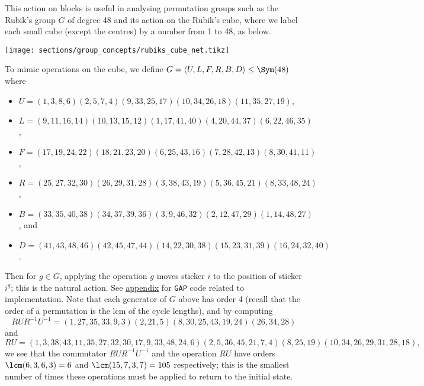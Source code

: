 \begin{example}\label{eg:rubiks_group}
    This action on blocks is useful in analysing permutation groups such as the Rubik's group $G$ of degree 48 and its action on the Rubik's cube, where we label each small cube (except the centres) by a number from 1 to 48, as below.

    \begin{center}
        \texttt{[image: sections/group\_concepts/rubiks\_cube\_net.tikz]}
    \end{center}

    To mimic operations on the cube, we define $G = \langle U,L,F,R,B,D \rangle \leq \Sym(48)$ where
    \begin{itemize}
        \item $U = ( 1, 3, 8, 6)( 2, 5, 7, 4)( 9,33,25,17)(10,34,26,18)(11,35,27,19)$,
        \item $L = ( 9,11,16,14)(10,13,15,12)( 1,17,41,40)( 4,20,44,37)( 6,22,46,35)$,
        \item $F = (17,19,24,22)(18,21,23,20)( 6,25,43,16)( 7,28,42,13)( 8,30,41,11)$,
        \item $R = (25,27,32,30)(26,29,31,28)( 3,38,43,19)( 5,36,45,21)( 8,33,48,24)$,
        \item $B = (33,35,40,38)(34,37,39,36)( 3, 9,46,32)( 2,12,47,29)( 1,14,48,27)$, and
        \item $D = (41,43,48,46)(42,45,47,44)(14,22,30,38)(15,23,31,39)(16,24,32,40)$.
    \end{itemize}
    Then for $g \in G$, applying the operation $g$ moves sticker $i$ to the position of sticker $i^g$; this is the natural action. See \hyperref[app:rubiks_group]{appendix} for \texttt{GAP} code related to implementation. Note that each generator of $G$ above has order 4 (recall that the order of a permutation is the lcm of the cycle lengths), and by computing
    $$RUR^{-1}U^{-1} = (1,27,35,33,9,3)(2,21,5)(8,30,25,43,19,24)(26,34,28)$$
    and
    $$RU = (1,3,38,43,11,35,27,32,30,17,9,33,48,24,6)(2,5,36,45,21,7,4)(8,25,19)(10,34,26,29,31,28,18),$$
    we see that the commutator $RUR^{-1}U^{-1}$ and the operation $RU$ have orders $\lcm(6,3,6,3) = 6$ and $\lcm(15,7,3,7) = 105$ respectively; this is the smallest number of times these operations must be applied to return to the initial state.


\end{example}
